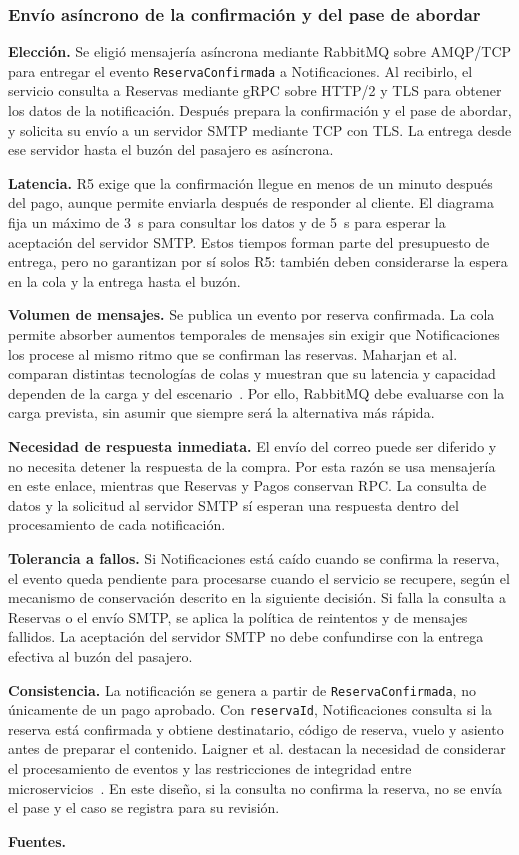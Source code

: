\documentclass[11pt,a4paper]{article}
\newcommand{\decision}[8]{\subsubsection*{#1}%
  \textbf{Elección.} #2\par
  \textbf{Latencia.} #3\par
  \textbf{Volumen de mensajes.} #4\par
  \textbf{Necesidad de respuesta inmediata.} #5\par
  \textbf{Tolerancia a fallos.} #6\par
  \textbf{Consistencia.} #7\par
  \textbf{Fuentes.} #8\par}
\begin{document}
\decision{Envío asíncrono de la confirmación y del pase de abordar}
{Se eligió mensajería asíncrona mediante RabbitMQ sobre AMQP/TCP
para entregar el evento \texttt{ReservaConfirmada} a
Notificaciones. Al recibirlo, el servicio consulta a Reservas
mediante gRPC sobre HTTP/2 y TLS para obtener los datos de
la notificación. Después prepara la confirmación y el pase
de abordar, y solicita su envío a un servidor SMTP mediante
TCP con TLS. La entrega desde ese servidor hasta el buzón
del pasajero es asíncrona.}
{R5 exige que la confirmación llegue en menos de un minuto
después del pago, aunque permite enviarla después de responder
al cliente. El diagrama fija un máximo de 3~s para consultar
los datos y de 5~s para esperar la aceptación del servidor
SMTP. Estos tiempos forman parte del presupuesto de entrega,
pero no garantizan por sí solos R5: también deben considerarse
la espera en la cola y la entrega hasta el buzón.}
{Se publica un evento por reserva confirmada. La cola permite
absorber aumentos temporales de mensajes sin exigir que
Notificaciones los procese al mismo ritmo que se confirman
las reservas. Maharjan et al. comparan distintas tecnologías
de colas y muestran que su latencia y capacidad dependen de
la carga y del escenario~\cite{maharjan2023}.
Por ello, RabbitMQ debe evaluarse con la carga prevista,
sin asumir que siempre será la alternativa más rápida.}
{El envío del correo puede ser diferido y no necesita detener
la respuesta de la compra. Por esta razón se usa mensajería
en este enlace, mientras que Reservas y Pagos conservan RPC.
La consulta de datos y la solicitud al servidor SMTP sí
esperan una respuesta dentro del procesamiento de cada
notificación.}
{Si Notificaciones está caído cuando se confirma la reserva,
el evento queda pendiente para procesarse cuando el servicio
se recupere, según el mecanismo de conservación descrito en
la siguiente decisión. Si falla la consulta a Reservas o
el envío SMTP, se aplica la política de reintentos y de
mensajes fallidos. La aceptación del servidor SMTP no debe
confundirse con la entrega efectiva al buzón del pasajero.}
{La notificación se genera a partir de
\texttt{ReservaConfirmada}, no únicamente de un pago aprobado.
Con \texttt{reservaId}, Notificaciones consulta si la reserva
está confirmada y obtiene destinatario, código de reserva,
vuelo y asiento antes de preparar el contenido. Laigner et al.
destacan la necesidad de considerar el procesamiento de
eventos y las restricciones de integridad entre
microservicios~\cite{laigner2025}. En este diseño,
si la consulta no confirma la reserva, no se envía el pase
y el caso se registra para su revisión.}
{\cite{maharjan2023,laigner2025}}
\end{document}
